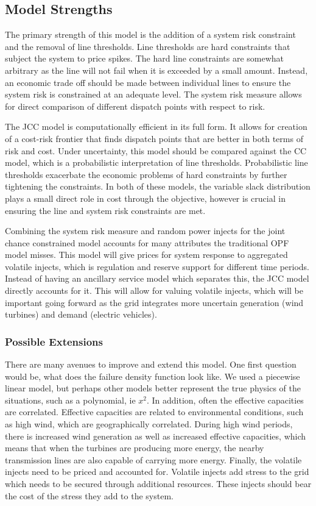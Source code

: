 \subsection{Model Strengths}
The primary strength of this model is the addition of a system risk constraint and the removal of line thresholds. Line thresholds are hard constraints that subject the system to price spikes.  The hard line constraints are somewhat arbitrary as the line will not fail when it is exceeded by a small amount.  Instead, an economic trade off should be made between individual lines to ensure the system risk is constrained at an adequate level.  The system risk measure allows for direct comparison of different dispatch points with respect to risk.

The JCC model is computationally efficient in its full form.  It allows for creation of a cost-risk frontier that finds dispatch points that are better in both terms of risk and cost.  Under uncertainty, this model should be compared against the CC model, which is a probabilistic interpretation of line thresholds.  Probabilistic line thresholds exacerbate the economic problems of hard constraints by further tightening the constraints.  In both of these models, the variable slack distribution plays a small direct role in cost through the objective, however is crucial in ensuring the line and system risk constraints are met.  
  
Combining the system risk measure and random power injects for the joint chance constrained model accounts for many attributes the traditional OPF model misses.  This model will give prices for system response to aggregated volatile injects, which is regulation and reserve support for different time periods.  Instead of having an ancillary service model which separates this, the JCC model directly accounts for it.  This will allow for valuing volatile injects, which will be important going forward as the grid integrates more uncertain generation (wind turbines) and demand (electric vehicles).

\subsubsection{Possible Extensions}
There are many avenues to improve and extend this model.  One first question would be, what does the failure density function look like.  We used a piecewise linear model, but perhaps other models better represent the true physics of the situations, such as a polynomial, ie $x^2$.  In addition, often the effective capacities are correlated.  Effective capacities are related to environmental conditions, such as high wind, which are geographically correlated.  During high wind periods, there is increased wind generation as well as increased effective capacities, which means that when the turbines are producing more energy, the nearby transmission lines are also capable of carrying more energy.  Finally, the volatile injects need to be priced and accounted for.  Volatile injects add stress to the grid which needs to be secured through additional resources.  These injects should bear the cost of the stress they add to the system.



